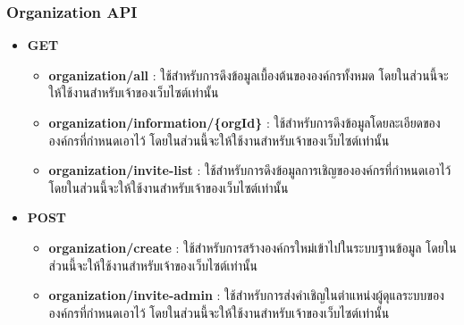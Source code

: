 \subsubsection{Organization API}

\ifenglish
\else
\begin{itemize}
    \item \textbf{GET}
    \begin{itemize}
        \item \textbf{organization/all} : ใช้สำหรับการดึงข้อมูลเบื้องต้นขององค์กรทั้งหมด โดยในส่วนนี้จะให้ใช้งานสำหรับเจ้าของเว็บไซต์เท่านั้น
        \item \textbf{organization/information/\{orgId\}} : ใช้สำหรับการดึงข้อมูลโดยละเอียดขององค์กรที่กำหนดเอาไว้ โดยในส่วนนี้จะให้ใช้งานสำหรับเจ้าของเว็บไซต์เท่านั้น
        \item \textbf{organization/invite-list} : ใช้สำหรับการดึงข้อมูลการเชิญขององค์กรที่กำหนดเอาไว้ โดยในส่วนนี้จะให้ใช้งานสำหรับเจ้าของเว็บไซต์เท่านั้น
    \end{itemize}
    \item \textbf{POST}
    \begin{itemize}
        \item \textbf{organization/create} : ใช้สำหรับการสร้างองค์กรใหม่เข้าไปในระบบฐานข้อมูล โดยในส่วนนี้จะให้ใช้งานสำหรับเจ้าของเว็บไซต์เท่านั้น
        \item \textbf{organization/invite-admin} : ใช้สำหรับการส่งคำเชิญในตำแหน่งผู้ดุแลระบบขององค์กรที่กำหนดเอาไว้ โดยในส่วนนี้จะให้ใช้งานสำหรับเจ้าของเว็บไซต์เท่านั้น
    \end{itemize}
\end{itemize}
\fi